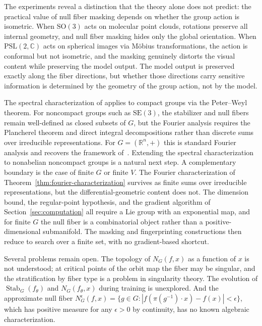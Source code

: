 \documentclass[11pt]{article}
\DeclareMathOperator{\Stab}{Stab}
\newcommand{\CC}{\mathbb{C}}
\newcommand{\RR}{\mathbb{R}}
\begin{document}
The experiments reveal a distinction that the theory alone does not predict: the practical value of null fiber masking depends on whether the group action is isometric. When $\mathrm{SO}(3)$ acts on molecular point clouds, rotations preserve all internal geometry, and null fiber masking hides only the global orientation. When $\mathrm{PSL}(2, \CC)$ acts on spherical images via M\"obius transformations, the action is conformal but not isometric, and the masking genuinely distorts the visual content while preserving the model output. The model output is preserved exactly along the fiber directions, but whether those directions carry sensitive information is determined by the geometry of the group action, not by the model.

The spectral characterization of  applies to compact groups via the Peter--Weyl theorem. For noncompact groups such as $\mathrm{SE}(3)$, the stabilizer and null fibers remain well-defined as closed subsets of $G$, but the Fourier analysis requires the Plancherel theorem and direct integral decompositions rather than discrete sums over irreducible representations. For $G = (\RR^n, +)$ this is standard Fourier analysis and recovers the framework of~\cite{li2025null}. Extending the spectral characterization to nonabelian noncompact groups is a natural next step. A complementary boundary is the case of finite $G$ or finite $V$. The Fourier characterization of Theorem~\ref{thm:fourier-characterization} survives as finite sums over irreducible representations, but the differential-geometric content does not. The dimension bound, the regular-point hypothesis, and the gradient algorithm of Section~\ref{sec:computation} all require a Lie group with an exponential map, and for finite $G$ the null fiber is a combinatorial object rather than a positive-dimensional submanifold. The masking and fingerprinting constructions then reduce to search over a finite set, with no gradient-based shortcut.

Several problems remain open. The topology of $N_G(f, x)$ as a function of $x$ is not understood; at critical points of the orbit map the fiber may be singular, and the stratification by fiber type is a problem in singularity theory. The evolution of $\Stab_G(f_\theta)$ and $N_G(f_\theta, x)$ during training is unexplored. And the approximate null fiber $N_G^\epsilon(f, x) = \{g \in G : |f(\pi(g^{-1}) \cdot x) - f(x)| < \epsilon\}$, which has positive measure for any $\epsilon > 0$ by continuity, has no known algebraic characterization.



\end{document}
